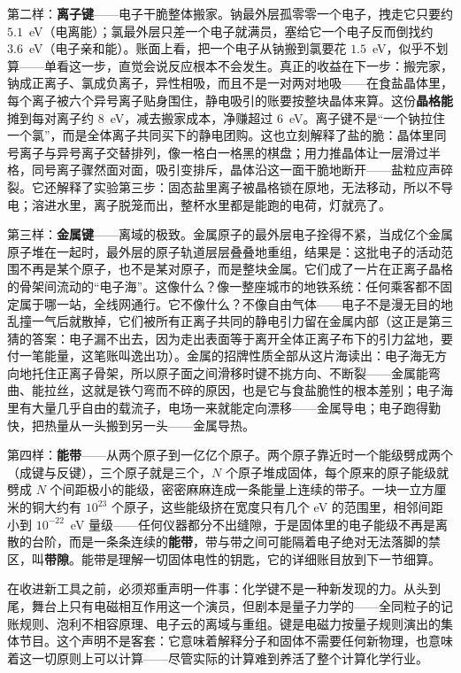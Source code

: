 第二样：\textbf{离子键}——电子干脆整体搬家。钠最外层孤零零一个电子，拽走它只要约 \(5.1\)~eV（电离能）；氯最外层只差一个电子就满员，塞给它一个电子反而倒找约 \(3.6\)~eV（电子亲和能）。账面上看，把一个电子从钠搬到氯要花 \(1.5\)~eV，似乎不划算——单看这一步，直觉会说反应根本不会发生。真正的收益在下一步：搬完家，钠成正离子、氯成负离子，异性相吸，而且不是一对两对地吸——在食盐晶体里，每个离子被六个异号离子贴身围住，静电吸引的账要按整块晶体来算。这份\textbf{晶格能}摊到每对离子约 \(8\)~eV，减去搬家成本，净赚超过 \(6\)~eV。离子键不是“一个钠拉住一个氯”，而是全体离子共同买下的静电团购。这也立刻解释了盐的脆：晶体里同号离子与异号离子交替排列，像一格白一格黑的棋盘；用力推晶体让一层滑过半格，同号离子骤然面对面，吸引变排斥，晶体沿这一面干脆地断开——盐粒应声碎裂。它还解释了实验第三步：固态盐里离子被晶格锁在原地，无法移动，所以不导电；溶进水里，离子脱笼而出，整杯水里都是能跑的电荷，灯就亮了。

第三样：\textbf{金属键}——离域的极致。金属原子的最外层电子拴得不紧，当成亿个金属原子堆在一起时，最外层的原子轨道层层叠叠地重组，结果是：这批电子的活动范围不再是某个原子，也不是某对原子，而是整块金属。它们成了一片在正离子晶格的骨架间流动的“电子海”。这像什么？像一整座城市的地铁系统：任何乘客都不固定属于哪一站，全线网通行。它不像什么？不像自由气体——电子不是漫无目的地乱撞一气后就散掉，它们被所有正离子共同的静电引力留在金属内部（这正是第三猜的答案：电子漏不出去，因为走出表面等于离开全体正离子布下的引力盆地，要付一笔能量，这笔账叫逸出功）。金属的招牌性质全部从这片海读出：电子海无方向地托住正离子骨架，所以原子面之间滑移时键不挑方向、不断裂——金属能弯曲、能拉丝，这就是铁勺弯而不碎的原因，也是它与食盐脆性的根本差别；电子海里有大量几乎自由的载流子，电场一来就能定向漂移——金属导电；电子跑得勤快，把热量从一头搬到另一头——金属导热。

第四样：\textbf{能带}——从两个原子到一亿亿个原子。两个原子靠近时一个能级劈成两个（成键与反键），三个原子就是三个，\(N\) 个原子堆成固体，每个原来的原子能级就劈成 \(N\) 个间距极小的能级，密密麻麻连成一条能量上连续的带子。一块一立方厘米的铜大约有 \(10^{23}\) 个原子，这些能级挤在宽度只有几个 eV 的范围里，相邻间距小到 \(10^{-22}\)~eV 量级——任何仪器都分不出缝隙，于是固体里的电子能级不再是离散的台阶，而是一条条连续的\textbf{能带}，带与带之间可能隔着电子绝对无法落脚的禁区，叫\textbf{带隙}。能带是理解一切固体电性的钥匙，它的详细账目放到下一节细算。

在收进新工具之前，必须郑重声明一件事：化学键不是一种新发现的力。从头到尾，舞台上只有电磁相互作用这一个演员，但剧本是量子力学的——全同粒子的记账规则、泡利不相容原理、电子云的离域与重组。键是电磁力按量子规则演出的集体节目。这个声明不是客套：它意味着解释分子和固体不需要任何新物理，也意味着这一切原则上可以计算——尽管实际的计算难到养活了整个计算化学行业。

